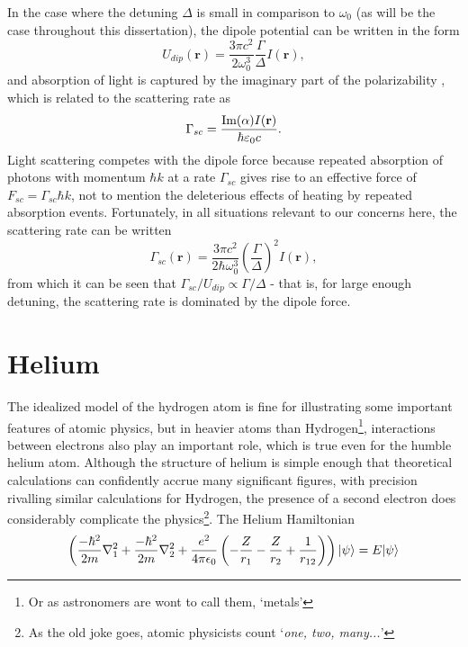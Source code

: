 	In the case where the detuning $\Delta$ is small in comparison to $\omega_0$ (as will be the case throughout this dissertation), the dipole potential can be written in the form \cite{grimm00}
	\begin{equation}
		U_{dip}(\textbf{r}) = \frac{3\pi c^2}{2\omega_0^3}\frac{\Gamma}{\Delta}I(\textbf{r}),
	\end{equation}
	and absorption of light is captured by the imaginary part of the polarizability \cite{FootAtomic}, which is related to the scattering rate as
	\begin{equation}
		\Gamma_{sc} = \frac{\textrm{Im}(\alpha)I(\textbf{r})}{\hbar\varepsilon_0 c}.
	\end{equation}
	Light scattering competes with the dipole force because repeated absorption of photons with momentum $\hbar k$ at a rate $\Gamma_{sc}$ gives rise to an effective force of $F_{sc}=\Gamma_{sc}\hbar k$, not to mention the deleterious effects of heating by repeated absorption events.
	Fortunately, in all situations relevant to our concerns here, the scattering rate can be written 
	\begin{equation}
		\Gamma_{sc}(\textbf{r}) = \frac{3\pi c^2}{2\hbar\omega_0^3}\left(\frac{\Gamma}{\Delta}\right)^2 I(\textbf{r}),
	\end{equation}
	from which it can be seen that $\Gamma_{sc}/U_{dip} \propto \Gamma/\Delta$ - that is, for large enough detuning, the scattering rate is dominated by the dipole force.
	

		
\section{Helium} 

	The idealized model of the hydrogen atom is fine for illustrating some important features of atomic physics, but in heavier atoms than Hydrogen\footnote{Or as astronomers are wont to call them, `metals'}, interactions between electrons also play an important role, which is true even for the humble helium atom.
	Although the structure of helium is simple enough that theoretical calculations can confidently accrue many significant figures, with precision rivalling similar calculations for Hydrogen, the presence of a second electron does considerably complicate the physics\footnote{As the old joke goes, atomic physicists count `\emph{one, two, many...}'}.
	The Helium Hamiltonian 
	$$
	\left(\frac{-\hbar^2}{2m}\nabla_{1}^2+\frac{-\hbar^2}{2m}\nabla_{2}^2 + \frac{e^2}{4\pi\epsilon_0}\left(-\frac{Z}{r_1}-\frac{Z}{r_2}+\frac{1}{r_{12}}\right) \right)|\psi\rangle = E |\psi\rangle
	$$

